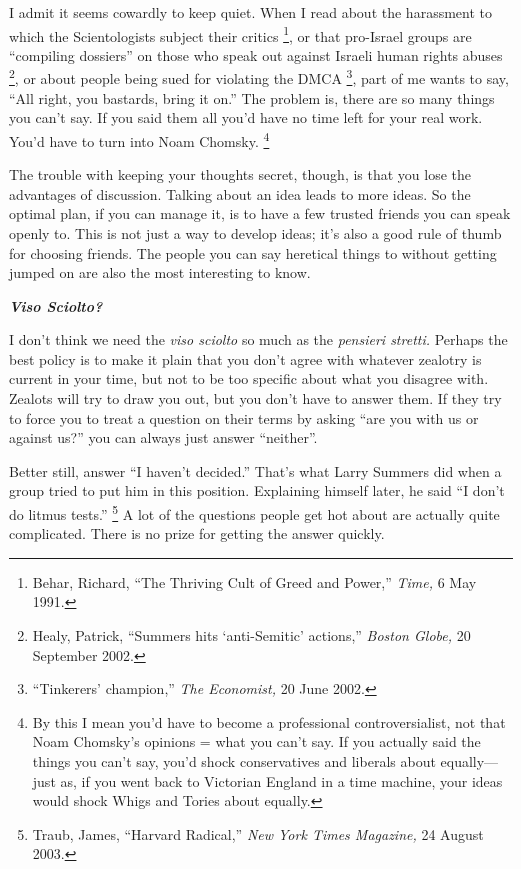 I admit it seems cowardly to keep quiet. When I read about the
harassment to which the Scientologists subject their critics \footnote{Behar, Richard, ``The Thriving Cult of Greed and Power,''
\emph{Time,} 6 May 1991.},
or that pro-Israel groups are ``compiling dossiers'' on those who speak
out against Israeli human rights abuses \footnote{Healy, Patrick, ``Summers hits `anti-Semitic' actions,''
\emph{Boston Globe,} 20 September 2002.}, or about people being
sued for violating the DMCA \footnote{``Tinkerers' champion,'' \emph{The Economist,} 20 June 2002.}, part of me wants to say, ``All
right, you bastards, bring it on.'' The problem is, there are so many
things you can't say. If you said them all you'd have no time left for
your real work. You'd have to turn into Noam Chomsky. \footnote{By this I mean you'd have to become a professional
controversialist, not that Noam Chomsky's opinions = what you can't say.
If you actually said the things you can't say, you'd shock conservatives
and liberals about equally---just as, if you went back to Victorian
England in a time machine, your ideas would shock Whigs and Tories about
equally.}

The trouble with keeping your thoughts secret, though, is that you lose
the advantages of discussion. Talking about an idea leads to more ideas.
So the optimal plan, if you can manage it, is to have a few trusted
friends you can speak openly to. This is not just a way to develop
ideas; it's also a good rule of thumb for choosing friends. The people
you can say heretical things to without getting jumped on are also the
most interesting to know.

\textbf{\emph{Viso Sciolto?}}

I don't think we need the \emph{viso sciolto} so much as the
\emph{pensieri stretti.} Perhaps the best policy is to make it plain
that you don't agree with whatever zealotry is current in your time, but
not to be too specific about what you disagree with. Zealots will try to
draw you out, but you don't have to answer them. If they try to force
you to treat a question on their terms by asking ``are you with us or
against us?'' you can always just answer ``neither''.

Better still, answer ``I haven't decided.'' That's what Larry Summers
did when a group tried to put him in this position. Explaining himself
later, he said ``I don't do litmus tests.'' \footnote{Traub, James, ``Harvard Radical,'' \emph{New York Times
Magazine,} 24 August 2003.} A lot of the
questions people get hot about are actually quite complicated. There is
no prize for getting the answer quickly.

